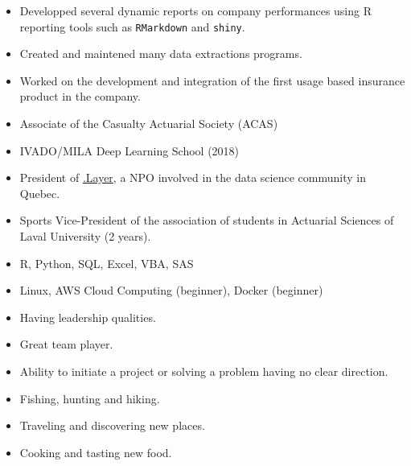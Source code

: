 \documentclass[10pt,a4paper,ragged2e]{altacv}
\begin{document}
\divider

\begin{itemize}
	\item Developped several dynamic reports on company performances using R reporting tools such as \texttt{RMarkdown} and \texttt{shiny}.
	\item Created and maintened many data extractions programs.
	\item Worked on the development and integration of the first usage based insurance product in the company.
\end{itemize}

\smallskip
\begin{itemize}
\item Associate of the Casualty Actuarial Society (ACAS)
\item IVADO/MILA Deep Learning School (2018)
\item President of \href{https://www.dotlayer.org/en/about/}{.Layer}, a NPO involved in the data science community in Quebec.
\item Sports Vice-President of the association of students in Actuarial Sciences of Laval University (2 years).
\end{itemize}

\smallskip
\begin{itemize}
\item R, Python, SQL, Excel, VBA, SAS
\item Linux, AWS Cloud Computing (beginner), Docker (beginner)
\end{itemize}

\smallskip
\begin{itemize}
\item Having leadership qualities.
\item Great team player.
\item Ability to initiate a project or solving a problem having no clear direction.
\end{itemize}

\smallskip
\begin{itemize}
\item Fishing, hunting and hiking.
\item Traveling and discovering new places.
\item Cooking and tasting new food.
\end{itemize}
\end{document}
